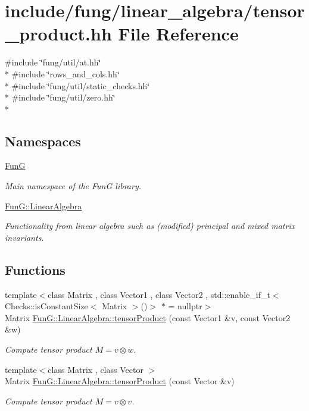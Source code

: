 \hypertarget{tensor__product_8hh}{\section{include/fung/linear\-\_\-algebra/tensor\-\_\-product.hh File Reference}
\label{tensor__product_8hh}
}
{\ttfamily \#include \char`\"{}fung/util/at.\-hh\char`\"{}}\\*
{\ttfamily \#include \char`\"{}rows\-\_\-and\-\_\-cols.\-hh\char`\"{}}\\*
{\ttfamily \#include \char`\"{}fung/util/static\-\_\-checks.\-hh\char`\"{}}\\*
{\ttfamily \#include \char`\"{}fung/util/zero.\-hh\char`\"{}}\\*
\subsection*{Namespaces}
\begin{DoxyCompactItemize}
\item 
\hyperlink{namespaceFunG}{Fun\-G}
\begin{DoxyCompactList}\small\item\em Main namespace of the Fun\-G library. \end{DoxyCompactList}\item 
\hyperlink{namespaceFunG_1_1LinearAlgebra}{Fun\-G\-::\-Linear\-Algebra}
\begin{DoxyCompactList}\small\item\em Functionality from linear algebra such as (modified) principal and mixed matrix invariants. \end{DoxyCompactList}\end{DoxyCompactItemize}
\subsection*{Functions}
\begin{DoxyCompactItemize}
\item 
{\footnotesize template$<$class Matrix , class Vector1 , class Vector2 , std\-::enable\-\_\-if\-\_\-t$<$ Checks\-::is\-Constant\-Size$<$ Matrix $>$()$>$ $\ast$  = nullptr$>$ }\\Matrix \hyperlink{group__LinearAlgebraGroup_ga5d0e066e6184fb3324d96d20087b5578}{Fun\-G\-::\-Linear\-Algebra\-::tensor\-Product} (const Vector1 \&v, const Vector2 \&w)
\begin{DoxyCompactList}\small\item\em Compute tensor product $ M = v \otimes w $. \end{DoxyCompactList}\item 
{\footnotesize template$<$class Matrix , class Vector $>$ }\\Matrix \hyperlink{group__LinearAlgebraGroup_gae5e82b9e66319511dae5ff0d9304a6b7}{Fun\-G\-::\-Linear\-Algebra\-::tensor\-Product} (const Vector \&v)
\begin{DoxyCompactList}\small\item\em Compute tensor product $ M = v \otimes v $. \end{DoxyCompactList}\end{DoxyCompactItemize}
